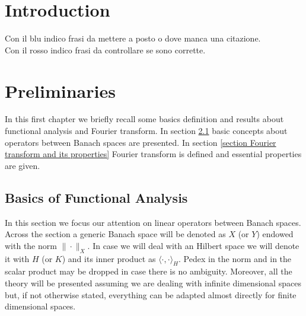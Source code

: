 \documentclass[corpo=11pt, stile=classica, tipotesi=custom,
greek, evenboxes, english]{toptesi}
\numberwithin{equation}{chapter}
\theoremstyle{remark}
\begin{document}
\english
	


\tableofcontents

\ringraziamenti

\sommario

\chapter{Introduction}
{\color{blue} Con il blu indico frasi da mettere a posto o dove manca una citazione.}\\
{\color{red} Con il rosso indico frasi da controllare se sono corrette.}




\chapter{Preliminaries}\label{chapter preliminaries}
In this first chapter we briefly recall some basics definition and results about functional analysis and Fourier transform. In section \ref{section basics of functional analysis} basic concepts about operators between Banach spaces are presented. In section \ref{section Fourier transform and its properties} Fourier transform is defined and essential properties are given.
\section{Basics of Functional Analysis}\label{section basics of functional analysis}
In this section we focus our attention on linear operators between Banach spaces. Across the section a generic Banach space will be denoted as $X$ (or $Y$) endowed with the norm $\| \cdot \|_X$. In case we will deal with an Hilbert space we will denote it with $H$ (or $K$) and its inner product as $\langle \cdot, \cdot \rangle_H$. {\color{red}Pedex in the norm and in the scalar product may be dropped in case there is no ambiguity}. {\color{red} Moreover, all the theory will be presented assuming we are dealing with infinite dimensional spaces but, if not otherwise stated, everything can be adapted almost directly for finite dimensional spaces.}
\end{document}
